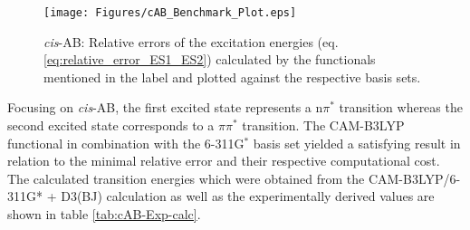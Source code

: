 
\begin{figure}[H]
    \centering
    \texttt{[image: Figures/cAB\_Benchmark\_Plot.eps]}
    \caption{\textit{cis}-AB: Relative errors of the excitation energies (eq. \ref{eq:relative_error_ES1_ES2}) calculated by the functionals mentioned in the label and plotted against the respective basis sets.}
    \label{fig:cAB_Benchmark}
\end{figure}
%
Focusing on \textit{cis}-AB, the first excited state represents a $\text{n}\pi^{*}$ transition whereas the second excited state corresponds to a $\pi\pi^{*}$ transition. 
The CAM-B3LYP functional in combination with the 6-311G$^{*}$ basis set yielded a satisfying result in relation to the minimal relative error and their respective computational cost. \newline
The calculated transition energies which were obtained from the CAM-B3LYP/6-311G* + D3(BJ) calculation as well as the experimentally derived values are shown in table \ref{tab:cAB-Exp-calc}.\\
%
%
%
